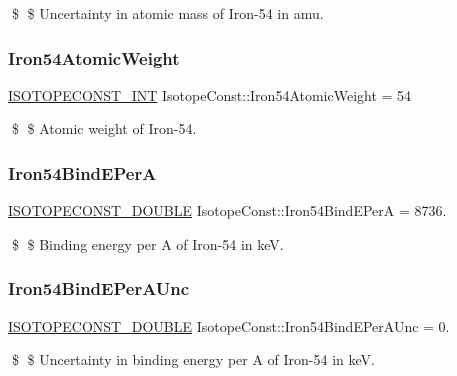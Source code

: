 \$ \$ Uncertainty in atomic mass of Iron-\/54 in amu. \mbox{\label{group___isotope_const-_iron-_fe54_ga70d668d471ccde02d2301fb72d22046e}} 
\subsubsection{\texorpdfstring{Iron54\+Atomic\+Weight}{Iron54AtomicWeight}}
{\footnotesize\ttfamily \mbox{\hyperlink{group___isotope_const-_macros_ga5f18360b3e99483a35c32d789e62621c}{I\+S\+O\+T\+O\+P\+E\+C\+O\+N\+S\+T\+\_\+\+I\+NT}} Isotope\+Const\+::\+Iron54\+Atomic\+Weight = 54}

\$ \$ Atomic weight of Iron-\/54. \mbox{\label{group___isotope_const-_iron-_fe54_ga8fd9fa1bd54a2e51a335859dca9ef556}} 
\subsubsection{\texorpdfstring{Iron54\+Bind\+E\+PerA}{Iron54BindEPerA}}
{\footnotesize\ttfamily \mbox{\hyperlink{group___isotope_const-_macros_ga8f45a7272ce02c0b4c65c44636ed719a}{I\+S\+O\+T\+O\+P\+E\+C\+O\+N\+S\+T\+\_\+\+D\+O\+U\+B\+LE}} Isotope\+Const\+::\+Iron54\+Bind\+E\+PerA = 8736.}

\$ \$ Binding energy per A of Iron-\/54 in keV. \mbox{\label{group___isotope_const-_iron-_fe54_gae64e84c13d7ae166a263c79616711952}} 
\subsubsection{\texorpdfstring{Iron54\+Bind\+E\+Per\+A\+Unc}{Iron54BindEPerAUnc}}
{\footnotesize\ttfamily \mbox{\hyperlink{group___isotope_const-_macros_ga8f45a7272ce02c0b4c65c44636ed719a}{I\+S\+O\+T\+O\+P\+E\+C\+O\+N\+S\+T\+\_\+\+D\+O\+U\+B\+LE}} Isotope\+Const\+::\+Iron54\+Bind\+E\+Per\+A\+Unc = 0.}

\$ \$ Uncertainty in binding energy per A of Iron-\/54 in keV. \mbox{\label{group___isotope_const-_iron-_fe54_ga44b544dc5126857a6e4e7a91f778e51b}} 
